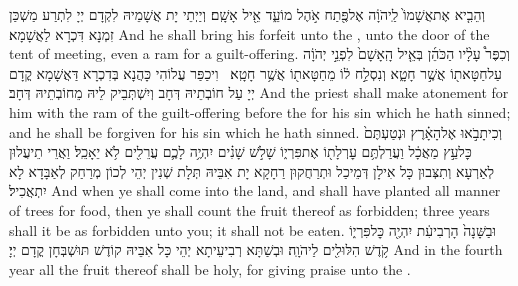 {וְהֵבִ֤יא אֶת\maqqaf אֲשָׁמוֹ֙ לַֽיהֹוָ֔ה אֶל\maqqaf פֶּ֖תַח אֹ֣הֶל מוֹעֵ֑ד אֵ֖יל אָשָֽׁם׃}
{וְיַיְתֵי יָת אֲשָׁמֵיהּ לִקְדָם יְיָ לִתְרַע מַשְׁכַּן זִמְנָא דִּכְרָא לַאֲשָׁמָא׃}
{And he shall bring his forfeit unto the \lord, unto the door of the tent of meeting, even a ram for a guilt-offering.}{}
{וְכִפֶּר֩ עָלָ֨יו הַכֹּהֵ֜ן בְּאֵ֤יל הָֽאָשָׁם֙ לִפְנֵ֣י יְהֹוָ֔ה עַל\maqqaf חַטָּאת֖וֹ אֲשֶׁ֣ר חָטָ֑א וְנִסְלַ֣ח ל֔וֹ מֵחַטָּאת֖וֹ אֲשֶׁ֥ר חָטָֽא׃ \petucha }
{וִיכַפַּר עֲלוֹהִי כָּהֲנָא בְּדִכְרָא דַּאֲשָׁמָא קֳדָם יְיָ עַל חוֹבְתֵיהּ דְּחָב וְיִשְׁתְּבֵיק לֵיהּ מֵחוֹבְתֵיהּ דְּחָב׃}
{And the priest shall make atonement for him with the ram of the guilt-offering before the \lord\space for his sin which he hath sinned; and he shall be forgiven for his sin which he hath sinned.}{}
{וְכִי\maqqaf תָבֹ֣אוּ אֶל\maqqaf הָאָ֗רֶץ וּנְטַעְתֶּם֙ כׇּל\maqqaf עֵ֣ץ מַאֲכָ֔ל וַעֲרַלְתֶּ֥ם עׇרְלָת֖וֹ אֶת\maqqaf פִּרְי֑וֹ שָׁלֹ֣שׁ שָׁנִ֗ים יִהְיֶ֥ה לָכֶ֛ם עֲרֵלִ֖ים לֹ֥א יֵאָכֵֽל׃}
{וַאֲרֵי תֵיעֲלוּן לְאַרְעָא וְתִצְּבוּן כָּל אִילָן דְּמֵיכַל וּתְרַחֲקוּן רַחָקָא יָת אִבֵּיהּ תְּלָת שְׁנִין יְהֵי לְכוֹן מְרַחַק לְאַבָּדָא לָא יִתְאֲכִיל׃}
{And when ye shall come into the land, and shall have planted all manner of trees for food, then ye shall count the fruit thereof as forbidden; three years shall it be as forbidden unto you; it shall not be eaten.}{}
{וּבַשָּׁנָה֙ הָרְבִיעִ֔ת יִהְיֶ֖ה כׇּל\maqqaf פִּרְי֑וֹ קֹ֥דֶשׁ הִלּוּלִ֖ים לַיהֹוָֽה׃}
{וּבְשַׁתָּא רְבִיעֵיתָא יְהֵי כָּל אִבֵּיהּ קוֹדֶשׁ תּוּשְׁבְּחָן קֳדָם יְיָ׃}
{And in the fourth year all the fruit thereof shall be holy, for giving praise unto the \lord.}{}
